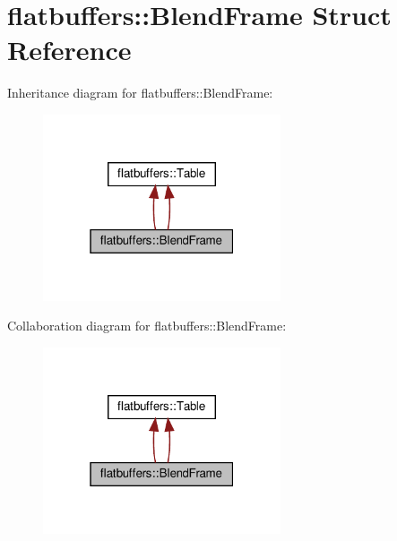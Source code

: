 \hypertarget{structflatbuffers_1_1BlendFrame}{}\section{flatbuffers\+:\+:Blend\+Frame Struct Reference}
\label{structflatbuffers_1_1BlendFrame}


Inheritance diagram for flatbuffers\+:\+:Blend\+Frame\+:
\nopagebreak
\begin{figure}[H]
\begin{center}
\leavevmode
\includegraphics[width=199pt]{structflatbuffers_1_1BlendFrame__inherit__graph}
\end{center}
\end{figure}


Collaboration diagram for flatbuffers\+:\+:Blend\+Frame\+:
\nopagebreak
\begin{figure}[H]
\begin{center}
\leavevmode
\includegraphics[width=199pt]{structflatbuffers_1_1BlendFrame__coll__graph}
\end{center}
\end{figure}
